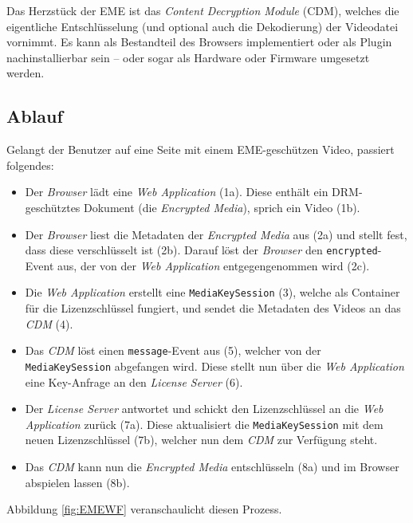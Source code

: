 \documentclass[a4paper,11pt]{scrartcl}
\begin{document}
Das Herzstück der EME ist das \textit{Content Decryption Module} (CDM), welches die eigentliche Entschlüsselung (und optional auch die Dekodierung) der Videodatei vornimmt. Es kann als Bestandteil des Browsers implementiert oder als Plugin nachinstallierbar sein -- oder sogar als Hardware oder Firmware umgesetzt werden.

\subsection{Ablauf}

Gelangt der Benutzer auf eine Seite mit einem EME-geschützen Video, passiert folgendes:

\begin{itemize}
    \item{Der \textit{Browser} lädt eine \textit{Web Application} (1a). Diese enthält ein DRM-geschütztes Dokument (die \textit{Encrypted Media}), sprich ein Video (1b).}
    \item{Der \textit{Browser} liest die Metadaten der \textit{Encrypted Media} aus (2a) und stellt fest, dass diese verschlüsselt ist (2b). Darauf löst der \textit{Browser} den \texttt{encrypted}-Event aus, der von der \textit{Web Application} entgegengenommen wird (2c).}
    \item{Die \textit{Web Application} erstellt eine \texttt{MediaKeySession} (3), welche als Container für die Lizenzschlüssel fungiert, und sendet die Metadaten des Videos an das \textit{CDM} (4).}
    \item{Das \textit{CDM} löst einen \texttt{message}-Event aus (5), welcher von der \texttt{MediaKeySession} abgefangen wird. Diese stellt nun über die \textit{Web Application} eine Key-Anfrage an den \textit{License Server} (6).}
    \item{Der \textit{License Server} antwortet und schickt den Lizenzschlüssel an die \textit{Web Application} zurück (7a). Diese aktualisiert die \texttt{MediaKeySession} mit dem neuen Lizenzschlüssel (7b), welcher nun dem \textit{CDM} zur Verfügung steht.}
    \item{Das \textit{CDM} kann nun die \textit{Encrypted Media} entschlüsseln (8a) und im Browser abspielen lassen (8b).}
\end{itemize}

Abbildung \ref{fig:EMEWF} veranschaulicht diesen Prozess.

\end{document}
